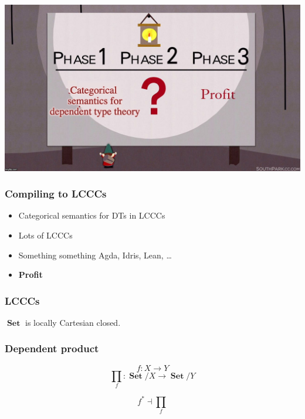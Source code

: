 \documentclass[
xcolor={usenames,dvipsnames,svgnames},
]{beamer}
\DeclareMathOperator{\Set}{\mathbf{Set}}
\begin{document}
  {\usebackgroundtemplate%
  {%
  \parbox[c][\paperheight][c]{\paperwidth}{\centering\includegraphics[width=\paperwidth]{graphics/profit.jpg}}
  }
  \begin{frame}
  \end{frame}
  }

  \begin{frame}
    \frametitle{Compiling to LCCCs}
    \begin{itemize}
      \item Categorical semantics for DTs in LCCCs
      \item Lots of LCCCs
      \item Something something Agda, Idris, Lean, \dots
      \item \textbf{Profit}
    \end{itemize}
  \end{frame}

  \begin{frame}
    \frametitle{LCCCs}
    \begin{center}
      $\Set$
      is locally Cartesian closed.
    \end{center}
  \end{frame}

  \begin{frame}
    \frametitle{Dependent product}
    \begin{center}

      \[
        f : X \to Y
      \]
      \[
        \prod_f: \Set/X \to \Set/Y
      \]

      \[
        f^\ast \dashv \prod_f
      \]


    \end{center}
  \end{frame}
\end{document}
